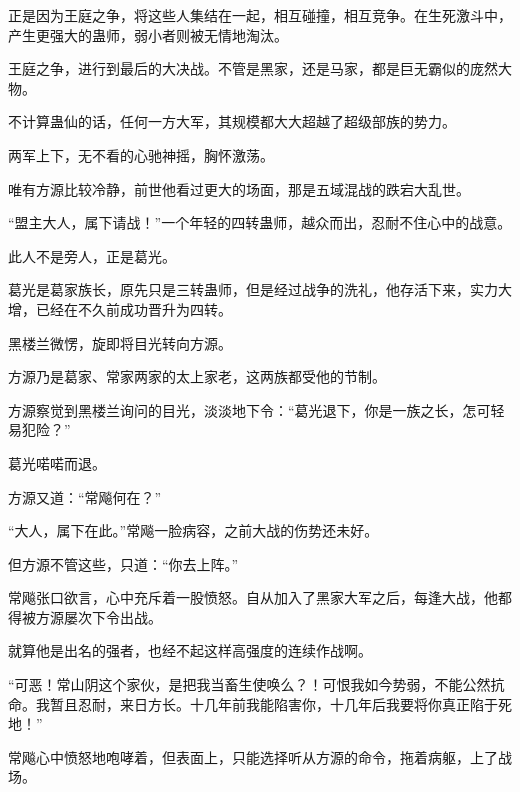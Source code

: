 \begin{this_body}
正是因为王庭之争，将这些人集结在一起，相互碰撞，相互竞争。在生死激斗中，产生更强大的蛊师，弱小者则被无情地淘汰。

王庭之争，进行到最后的大决战。不管是黑家，还是马家，都是巨无霸似的庞然大物。

不计算蛊仙的话，任何一方大军，其规模都大大超越了超级部族的势力。

两军上下，无不看的心驰神摇，胸怀激荡。

唯有方源比较冷静，前世他看过更大的场面，那是五域混战的跌宕大乱世。

“盟主大人，属下请战！”一个年轻的四转蛊师，越众而出，忍耐不住心中的战意。

此人不是旁人，正是葛光。

葛光是葛家族长，原先只是三转蛊师，但是经过战争的洗礼，他存活下来，实力大增，已经在不久前成功晋升为四转。

黑楼兰微愣，旋即将目光转向方源。

方源乃是葛家、常家两家的太上家老，这两族都受他的节制。

方源察觉到黑楼兰询问的目光，淡淡地下令：“葛光退下，你是一族之长，怎可轻易犯险？”

葛光喏喏而退。

方源又道：“常飚何在？”

“大人，属下在此。”常飚一脸病容，之前大战的伤势还未好。

但方源不管这些，只道：“你去上阵。”

常飚张口欲言，心中充斥着一股愤怒。自从加入了黑家大军之后，每逢大战，他都得被方源屡次下令出战。

就算他是出名的强者，也经不起这样高强度的连续作战啊。

“可恶！常山阴这个家伙，是把我当畜生使唤么？！可恨我如今势弱，不能公然抗命。我暂且忍耐，来日方长。十几年前我能陷害你，十几年后我要将你真正陷于死地！”

常飚心中愤怒地咆哮着，但表面上，只能选择听从方源的命令，拖着病躯，上了战场。

\end{this_body}

